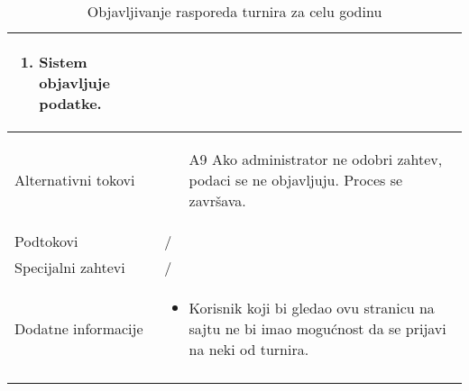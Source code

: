 \documentclass{article}
\begin{document}
\begin{longtable}{| p{} | p{} |}
\begin{enumerate}
                    \item Sistem objavljuje podatke.
                \end{enumerate}\\
        \hline
            Alternativni tokovi & 
                \begin{itemize}
                    \item[A9] Ako administrator ne odobri zahtev, podaci se ne objavljuju. Proces se završava.
                \end{itemize}\\
        \hline
            Podtokovi & /\\
        \hline
            Specijalni zahtevi & /\\
        \hline
            Dodatne informacije & 
                \begin{itemize}
                    \item Korisnik koji bi gledao ovu stranicu na sajtu ne bi imao mogućnost da se prijavi na neki od turnira.
                \end{itemize}\\
        \hline 
        \caption{Objavljivanje rasporeda turnira za celu godinu}
    \end{longtable}
\end{document}
